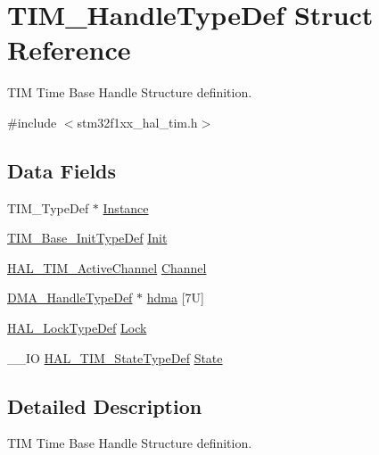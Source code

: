 \hypertarget{struct_t_i_m___handle_type_def}{}\section{T\+I\+M\+\_\+\+Handle\+Type\+Def Struct Reference}
\label{struct_t_i_m___handle_type_def}


T\+IM Time Base Handle Structure definition.  




{\ttfamily \#include $<$stm32f1xx\+\_\+hal\+\_\+tim.\+h$>$}

\subsection*{Data Fields}
\begin{DoxyCompactItemize}
\item 
T\+I\+M\+\_\+\+Type\+Def $\ast$ \hyperlink{struct_t_i_m___handle_type_def_a4076faade36875a6a05767135bb70b86}{Instance}
\item 
\hyperlink{struct_t_i_m___base___init_type_def}{T\+I\+M\+\_\+\+Base\+\_\+\+Init\+Type\+Def} \hyperlink{struct_t_i_m___handle_type_def_a21046dd4833b51c8e3f5c82ea134d03c}{Init}
\item 
\hyperlink{group___t_i_m___exported___types_gaa3fa7bcbb4707f1151ccfc90a8cf9706}{H\+A\+L\+\_\+\+T\+I\+M\+\_\+\+Active\+Channel} \hyperlink{struct_t_i_m___handle_type_def_a57eac61d1d06cad73bdd26dabe961753}{Channel}
\item 
\hyperlink{group___d_m_a___exported___types_ga92b907d56a9c29b93d46782a7a04f91e}{D\+M\+A\+\_\+\+Handle\+Type\+Def} $\ast$ \hyperlink{struct_t_i_m___handle_type_def_a9a87ff723657cc3d6a9556f0efdcbef1}{hdma} \mbox{[}7\+U\mbox{]}
\item 
\hyperlink{stm32f1xx__hal__def_8h_ab367482e943333a1299294eadaad284b}{H\+A\+L\+\_\+\+Lock\+Type\+Def} \hyperlink{struct_t_i_m___handle_type_def_ad4cf225029dbefe8d3fe660c33b8bb6b}{Lock}
\item 
\+\_\+\+\_\+\+IO \hyperlink{group___t_i_m___exported___types_gae0994cf5970e56ca4903e9151f40010c}{H\+A\+L\+\_\+\+T\+I\+M\+\_\+\+State\+Type\+Def} \hyperlink{struct_t_i_m___handle_type_def_ad4c7388b23a70d7a1a257d6c94df29f3}{State}
\end{DoxyCompactItemize}


\subsection{Detailed Description}
T\+IM Time Base Handle Structure definition. 

